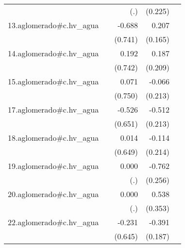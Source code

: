{\begin{longtable}{l*{4}{D{.}{.}{-1}}}
            &                     &         (.)         &     (0.225)         &                     \\
\addlinespace
13.aglomerado#c.hv\_agua&                     &      -0.688         &       0.207         &                     \\
            &                     &     (0.741)         &     (0.165)         &                     \\
\addlinespace
14.aglomerado#c.hv\_agua&                     &       0.192         &       0.187         &                     \\
            &                     &     (0.742)         &     (0.209)         &                     \\
\addlinespace
15.aglomerado#c.hv\_agua&                     &       0.071         &      -0.066         &                     \\
            &                     &     (0.750)         &     (0.213)         &                     \\
\addlinespace
17.aglomerado#c.hv\_agua&                     &      -0.526         &      -0.512\sym{*}  &                     \\
            &                     &     (0.651)         &     (0.213)         &                     \\
\addlinespace
18.aglomerado#c.hv\_agua&                     &       0.014         &      -0.114         &                     \\
            &                     &     (0.649)         &     (0.214)         &                     \\
\addlinespace
19.aglomerado#c.hv\_agua&                     &       0.000         &      -0.762\sym{**} &                     \\
            &                     &         (.)         &     (0.256)         &                     \\
\addlinespace
20.aglomerado#c.hv\_agua&                     &       0.000         &       0.538         &                     \\
            &                     &         (.)         &     (0.353)         &                     \\
\addlinespace
22.aglomerado#c.hv\_agua&                     &      -0.231         &      -0.391\sym{*}  &                     \\
            &                     &     (0.645)         &     (0.187)         &                     \\

\end{longtable}}
